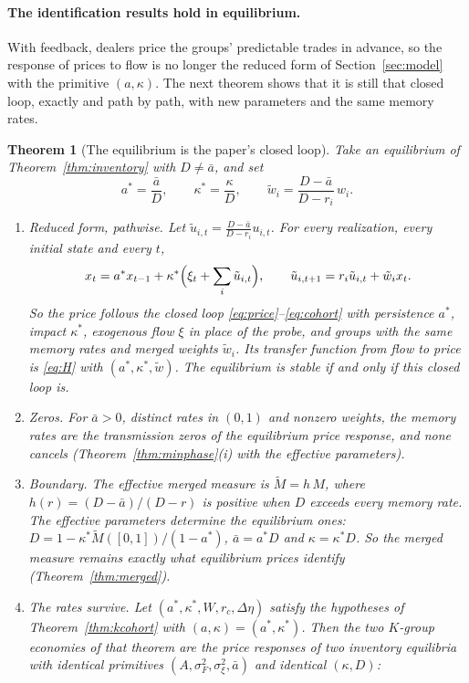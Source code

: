 \documentclass[12pt]{article}
\newtheorem{theorem}{Theorem}[section]
\theoremstyle{definition}
\theoremstyle{remark}
\begin{document}
\paragraph{The identification results hold in equilibrium.} With feedback, dealers price the groups' predictable trades in advance, so the response of prices to flow is no longer the reduced form of Section~\ref{sec:model} with the primitive $(a,\kappa)$. The next theorem shows that it is still that closed loop, exactly and path by path, with new parameters and the same memory rates.

\begin{theorem}[The equilibrium is the paper's closed loop]\label{thm:eqreduced}
Take an equilibrium of Theorem~\ref{thm:inventory} with $D\ne\bar a$, and set
\[
 a^*=\frac{\bar a}{D},\qquad \kappa^*=\frac{\kappa}{D},\qquad \tilde w_i=\frac{D-\bar a}{D-r_i}\,w_i .
\]
\begin{enumerate}[label=(\roman*),itemsep=1pt]
\item \emph{Reduced form, pathwise.} Let $\tilde u_{i,t}=\frac{D-\bar a}{D-r_i}u_{i,t}$. For every realization, every initial state and every $t$,
\[
 x_t=a^*x_{t-1}+\kappa^*\Bigl(\xi_t+\sum_i\tilde u_{i,t}\Bigr),\qquad \tilde u_{i,t+1}=r_i\tilde u_{i,t}+\tilde w_ix_t .
\]
So the price follows the closed loop \eqref{eq:price}--\eqref{eq:cohort} with persistence $a^*$, impact $\kappa^*$, exogenous flow $\xi$ in place of the probe, and groups with the same memory rates and merged weights $\tilde w_i$. Its transfer function from flow to price is \eqref{eq:H} with $(a^*,\kappa^*,\tilde w)$. The equilibrium is stable if and only if this closed loop is.
\item \emph{Zeros.} For $\bar a>0$, distinct rates in $(0,1)$ and nonzero weights, the memory rates are the transmission zeros of the equilibrium price response, and none cancels (Theorem~\ref{thm:minphase}(i) with the effective parameters).
\item \emph{Boundary.} The effective merged measure is $\tilde M=h\,M$, where $h(r)=(D-\bar a)/(D-r)$ is positive when $D$ exceeds every memory rate. The effective parameters determine the equilibrium ones: $D=1-\kappa^*\tilde M([0,1])/(1-a^*)$, $\bar a=a^*D$ and $\kappa=\kappa^*D$. So the merged measure remains exactly what equilibrium prices identify (Theorem~\ref{thm:merged}).
\item \emph{The rates survive.} Let $(a^*,\kappa^*,W,r_c,\Delta\eta)$ satisfy the hypotheses of Theorem~\ref{thm:kcohort} with $(a,\kappa)=(a^*,\kappa^*)$. Then the two $K$-group economies of that theorem are the price responses of two inventory equilibria with identical primitives $(A,\sigma_F^2,\sigma_\xi^2,\bar a)$ and identical $(\kappa,D)$:

\end{enumerate}
\end{theorem}
\end{document}
